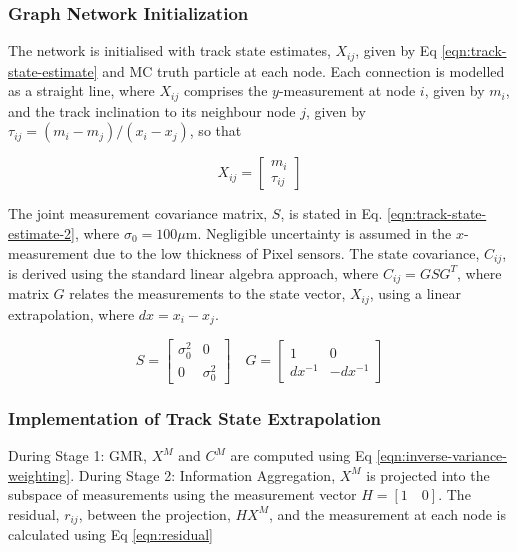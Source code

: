 \subsubsection{Graph Network Initialization}

The network is initialised with track state estimates, $X_{ij}$, given by Eq \eqref{eqn:track-state-estimate} and MC truth particle at each node. Each connection is modelled as a straight line, where $X_{ij}$ comprises the $y$-measurement at node $i$, given by $m_i$, and the track inclination to its neighbour node $j$, given by $\tau_{ij} = (m_i - m_j) / (x_i - x_j)$, so that

\begin{equation}
X_{ij} = \begin{bmatrix} m_i \\ \tau_{ij} \end{bmatrix}
\label{eqn:track-state-estimate}
\end{equation}


The joint measurement covariance matrix, $S$, is stated in Eq. \eqref{eqn:track-state-estimate-2}, where $\sigma_0 = 100\mu$m. Negligible uncertainty is assumed in the $x$-measurement due to the low thickness of Pixel sensors. The state covariance, $C_{ij}$, is derived using the standard linear algebra approach, where $C_{ij} = GSG^T$, where matrix $G$ relates the measurements to the state vector, $X_{ij}$, using a linear extrapolation, where $dx = x_i - x_j$.  

\begin{equation}
S = \begin{bmatrix} \sigma_0^{2} & 0 \\ 0 & \sigma_0^{2} \end{bmatrix}  \quad G = \begin{bmatrix} 1 & 0 \\ dx^{-1} & -dx^{-1}  \end{bmatrix}
\label{eqn:track-state-estimate-2}
\end{equation}


\subsubsection{Implementation of Track State Extrapolation}

During Stage 1: GMR, $X^{M}$ and $C^{M}$ are computed using Eq \eqref{eqn:inverse-variance-weighting}. During Stage 2: Information Aggregation, $X^M$ is projected into the subspace of measurements using the measurement vector $H = [1 \quad 0]$. The residual, $r_{ij}$, between the projection, $HX^M$, and the measurement at each node is calculated using Eq \eqref{eqn:residual}

